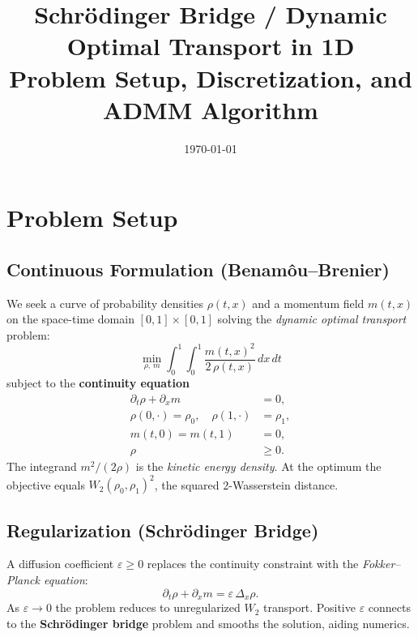 \documentclass[11pt]{article}
\title{\textbf{Schr\"odinger Bridge / Dynamic Optimal Transport in 1D}\\[4pt]
       \large Problem Setup, Discretization, and ADMM Algorithm}
\author{}
\date{\today}
\newcommand{\dx}{\,dx}
\newcommand{\dt}{\,dt}
\newcommand{\rhoO}{\rho_0}
\newcommand{\rhoT}{\rho_1}
\newcommand{\Dx}{\Delta_x}          %
\begin{document}
\maketitle
\tableofcontents
\bigskip

\section{Problem Setup}

\subsection{Continuous Formulation (Benam\^ou--Brenier)}

We seek a curve of probability densities $\rho(t,x)$ and a momentum field
$m(t,x)$ on the space-time domain $[0,1]\times[0,1]$ solving the
\emph{dynamic optimal transport} problem:
%
\begin{equation}\label{eq:ot}
\min_{\rho,\, m} \int_0^1\!\int_0^1
    \frac{m(t,x)^2}{2\,\rho(t,x)} \dx\dt
\end{equation}
%
subject to the \textbf{continuity equation}
\begin{align}
  \partial_t \rho + \partial_x m &= 0,
    \label{eq:cont}\\
  \rho(0,\cdot) = \rhoO,\quad
  \rho(1,\cdot) &= \rhoT,
    \label{eq:bc_t}\\
  m(t,0) = m(t,1) &= 0,
    \label{eq:bc_x}\\
  \rho &\geq 0.
    \label{eq:pos}
\end{align}
%
The integrand $m^2/(2\rho)$ is the \emph{kinetic energy density}.
At the optimum the objective equals $W_2(\rhoO,\rhoT)^2$, the squared
2-Wasserstein distance.

\subsection{Regularization (Schr\"odinger Bridge)}

A diffusion coefficient $\varepsilon \geq 0$ replaces the continuity
constraint with the \emph{Fokker--Planck equation}:
\begin{equation}\label{eq:fp}
  \partial_t \rho + \partial_x m = \varepsilon\,\Dx\rho.
\end{equation}
As $\varepsilon\to 0$ the problem reduces to unregularized $W_2$ transport.
Positive $\varepsilon$ connects to the \textbf{Schr\"odinger bridge} problem
and smooths the solution, aiding numerics.
\end{document}
